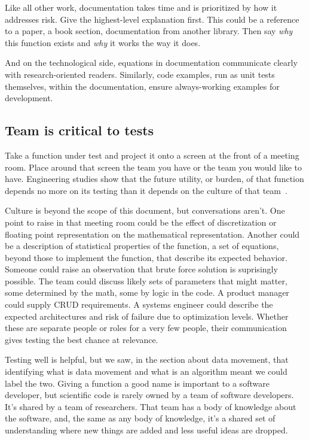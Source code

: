 \documentclass[fleqn,10pt]{olplainarticle}
\begin{document}
Like all other work, documentation takes time and is prioritized by
how it addresses risk. Give the highest-level explanation first.
This could be a reference to a paper, a book section, documentation from another library.
Then say \emph{why} this function exists and \emph{why} it works the
way it does.

And on the technological side, equations in documentation communicate
clearly with research-oriented readers. Similarly, code examples, run
as unit tests themselves, within the documentation, ensure always-working
examples for development.


\subsection{Team is critical to tests}

Take a function under test and project it onto a
screen at the front of a meeting room. Place around that screen
the team you have or the team you would like to have.
Engineering studies show that the future utility, or burden,
of that function depends no more on its testing than it
depends on the culture of that team~\citep{neumann2016,kanewala2014}.

Culture is beyond the scope of this document, but conversations
aren't. One point to raise in that meeting room could
be the effect of discretization or floating point representation
on the mathematical representation. Another could be a
description of statistical properties of the function, a set
of equations, beyond those to implement the function, that
describe its expected behavior. Someone could raise an observation
that brute force solution is suprisingly possible.
The team could discuss likely sets of parameters that might
matter, some determined by the math, some by logic in the
code. A product manager could supply CRUD requirements.
A systems engineer could describe the expected architectures
and risk of failure due to optimization levels. Whether these
are separate people or roles for a very few people, their
communication gives testing the best chance at relevance.

Testing well is helpful, but we saw, in the section about
data movement, that identifying what is data movement
and what is an algorithm meant we could label the two.
Giving a function a good name is important to a software
developer, but scientific code is rarely owned by a team
of software developers. It's shared by a team of researchers.
That team has a body of knowledge about the software, and,
the same as any body of knowledge, it's a shared set of
understanding where new things are added and less useful
ideas are dropped.
\end{document}
